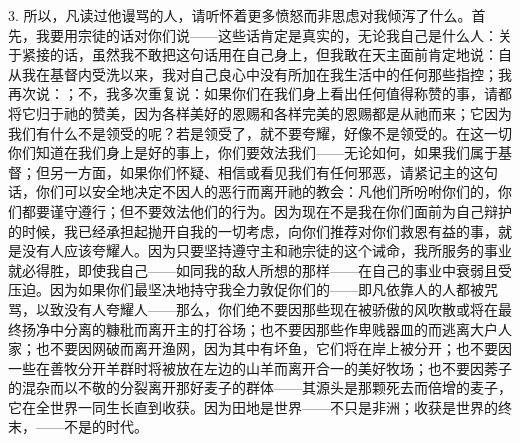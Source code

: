 3. 所以，凡读过他谩骂的人，请听怀着更多愤怒而非思虑对我倾泻了什么。首先，我要用宗徒的话对你们说——这些话肯定是真实的，无论我自己是什么人：关于紧接的话，虽然我不敢把这句话用在自己身上，但我敢在天主面前肯定地说：自从我在基督内受洗以来，我对自己良心中没有所加在我生活中的任何那些指控；我再次说：；不，我多次重复说：如果你们在我们身上看出任何值得称赞的事，请都将它归于祂的赞美，因为各样美好的恩赐和各样完美的恩赐都是从祂而来；它因为我们有什么不是领受的呢？若是领受了，就不要夸耀，好像不是领受的。在这一切你们知道在我们身上是好的事上，你们要效法我们——无论如何，如果我们属于基督；但另一方面，如果你们怀疑、相信或看见我们有任何邪恶，请紧记主的这句话，你们可以安全地决定不因人的恶行而离开祂的教会：凡他们所吩咐你们的，你们都要谨守遵行；但不要效法他们的行为。因为现在不是我在你们面前为自己辩护的时候，我已经承担起抛开自我的一切考虑，向你们推荐对你们救恩有益的事，就是没有人应该夸耀人。因为只要坚持遵守主和祂宗徒的这个诫命，我所服务的事业就必得胜，即使我自己——如同我的敌人所想的那样——在自己的事业中衰弱且受压迫。因为如果你们最坚决地持守我全力敦促你们的——即凡依靠人的人都被咒骂，以致没有人夸耀人——那么，你们绝不要因那些现在被骄傲的风吹散或将在最终扬净中分离的糠秕而离开主的打谷场；也不要因那些作卑贱器皿的而逃离大户人家；也不要因网破而离开渔网，因为其中有坏鱼，它们将在岸上被分开；也不要因一些在善牧分开羊群时将被放在左边的山羊而离开合一的美好牧场；也不要因莠子的混杂而以不敬的分裂离开那好麦子的群体——其源头是那颗死去而倍增的麦子，它在全世界一同生长直到收获。因为田地是世界——不只是非洲；收获是世界的终末，——不是的时代。\par


